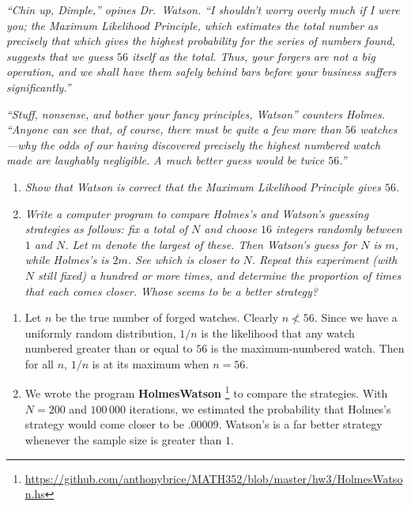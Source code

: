 \documentclass{tufte-handout}
\begin{document}
\emph{``Chin up, Dimple,'' opines Dr.~Watson. ``I shouldn't worry
  overly much if I were you; the Maximum Likelihood Principle, which
  estimates the total number as precisely that which gives the highest
  probability for the series of numbers found, suggests that we guess
  $56$ itself as the total. Thus, your forgers are not a big
  operation, and we shall have them safely behind bars before your
  business suffers significantly.''}

\emph{``Stuff, nonsense, and bother your fancy principles, Watson''
  counters Holmes. ``Anyone can see that, of course, there must be
  quite a few more than $56$ watches---why the odds of our having
  discovered precisely the highest numbered watch made are laughably
  negligible. A much better guess would be twice $56$.''}

\begin{enumerate}[label=\emph{(\alph*)}]
\item \emph{Show that Watson is correct that the Maximum
    Likelihood Principle gives $56$.}
\item \emph{Write a computer program to compare Holmes's and Watson's
    guessing strategies as follows: fix a total of $N$ and choose $16$
    integers randomly between $1$ and $N$. Let $m$ denote the largest
    of these. Then Watson's guess for $N$ is $m$, while Holmes's is
    $2m$. See which is closer to $N$. Repeat this experiment (with $N$
    still fixed) a hundred or more times, and determine the proportion
    of times that each comes closer. Whose seems to be a better
    strategy?}
\end{enumerate}

\bigskip

\begin{enumerate}[label=(\alph*)]
\item Let $n$ be the true number of forged watches. Clearly
  $n \nless 56$. Since we have a uniformly random distribution, $1/n$
  is the likelihood that any watch numbered greater than or equal to
  $56$ is the maximum-numbered watch. Then for all $n$,
  $1/n$ is at its maximum when $n = 56$.
\item We wrote the program
  \textbf{HolmesWatson}%
  \footnote{\url{https://github.com/anthonybrice/MATH352/blob/master/hw3/HolmesWatson.hs}}
  to compare the strategies. With $N = 200$ and $100\,000$ iterations,
  we estimated the probability that Holmes's strategy would come
  closer to be $.00009$. Watson's is a far better strategy whenever
  the sample size is greater than $1$.
\end{enumerate}
\end{document}
